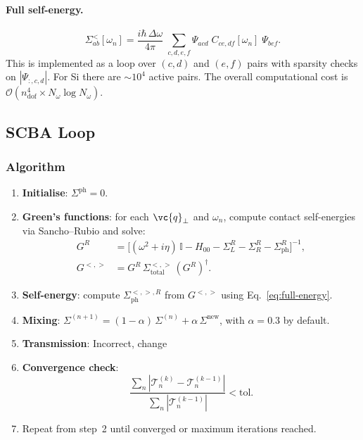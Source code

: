 \paragraph{Full self-energy.}
\begin{equation}\label{eq:full-energy}
  \Sigma^<_{ab}[\omega_n]
  = \frac{i\hbar\,\Delta\omega}{4\pi}\;
    \sum_{c,d,e,f} \Psi_{acd}\;C_{ce,df}[\omega_n]\;\Psi_{bef}.
\end{equation}
This is implemented as a loop over $(c,d)$ and $(e,f)$ pairs with
sparsity checks on $|\Psi_{:,c,d}|$.  For Si
there are $\sim10^4$ active pairs.  The overall
computational cost is $\mathcal{O}(n_\mathrm{dof}^4 \times N_\omega
\log N_\omega)$.


\subsection{SCBA Loop}
\label{sec:scba}

\subsubsection{Algorithm}

\begin{enumerate}
  \item \textbf{Initialise}: $\Sigma^\mathrm{ph} = 0$.
  \item \textbf{Green's functions}: for each $\vc{q}_\perp$ and
        $\omega_n$, compute contact self-energies via Sancho--Rubio and
        solve:
        \begin{align}
          G^R &= \bigl[(\omega^2 + i\eta)\,\mathbb{I}
            - H_{00} - \Sigma^R_L - \Sigma^R_R
            - \Sigma^R_\mathrm{ph}\bigr]^{-1}, \\
          G^{<,>} &= G^R\,\Sigma^{<,>}_\mathrm{total}\,(G^R)^\dagger.
        \end{align}
  \item \textbf{Self-energy}: compute $\Sigma^{<,>,R}_\mathrm{ph}$
        from $G^{<,>}$ using Eq.~\eqref{eq:full-energy}.
  \item \textbf{Mixing}:
        $\Sigma^{(n+1)} = (1-\alpha)\,\Sigma^{(n)} +
        \alpha\,\Sigma^\mathrm{new}$, with $\alpha = 0.3$ by default.
  \item \textbf{Transmission}: Incorrect, change
  \item \textbf{Convergence check}:
        \begin{equation}
          \frac{\sum_n |\mathcal{T}^{(k)}_n - \mathcal{T}^{(k-1)}_n|}
               {\sum_n |\mathcal{T}^{(k-1)}_n|}
          < \mathrm{tol}.
        \end{equation}
  \item Repeat from step~2 until converged or maximum iterations
        reached.
\end{enumerate}

